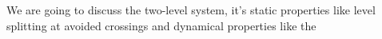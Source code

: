 We are going to discuss the two-level system, it's static properties like level splitting at avoided crossings and dynamical properties like the 